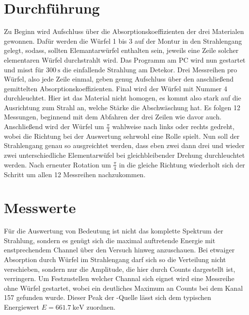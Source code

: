 \section{Durchführung}
Zu Beginn wird Aufschluss über die Absorptionskoeffizienten der drei Materialen gewonnen. 
Dafür werden die Würfel 1 bis 3 auf der Montur in den Strahlengang gelegt, sodass, sollten Elemantarwürfel enthalten sein, jeweils eine Zeile solcher elementaren Würfel 
durchstrahlt wird. Das Programm am PC wird nun gestartet und misst für $\SI{300}{\second}$ die einfallende Strahlung am Detekor. Drei Messreihen pro Würfel, also jede Zeile einmal, geben genug Aufschluss über den anschließend gemittelten Absorptionskoeffizienten.
Final wird der Würfel mit Nummer 4 durchleuchtet. Hier ist das Material nicht homogen, es kommt also stark auf die Ausrichtung zum Strahl an, welche Stärke
die Abschwäschung hat. Es folgen 12 Messungen, beginnend mit dem Abfahren der drei Zeilen wie davor auch. Anschließend wird der Würfel um 
$\frac{\pi}{4}$ wahlweise nach links oder rechts gedreht, wobei die Richtung bei der Auswertung sehrwohl eine Rolle spielt.
Nun soll der Strahlengang genau so ausgreichtet werden, dass eben zwei dann drei und wieder zwei unterschiedliche Elementarwüfel bei gleichbleibender Drehung
durchleuchtet werden. Nach erneuter Rotation um $\frac{\pi}{4}$ in die gleiche Richtung wiederholt sich der Schritt um 
allen 12 Messreihen nachzukommen.

\section{Messwerte}
Für die Auswertung von Bedeutung ist nicht das komplette Spektrum der Strahlung, sondern es genügt sich die maximal auftretende Energie mit enstprechendem
Channel über den Versuch hinweg anzuschauen. Bei etwaiger Absorption durch Würfel im Strahlengang darf sich so die Verteilung nicht verschieben, sondern 
nur die Amplitude, die hier durch Counts dargestellt ist, verringern.
Um Festzustellen welcher Channal sich eignet wird eine Messreihe ohne Würfel gestartet, wobei ein deutliches Maximum an Counts bei dem Kanal 157 gefunden wurde. Dieser Peak der -Quelle lässt sich dem typischen Energiewert
$E = \SI{661.7}{\kilo\electronvolt}$ zuordnen.



